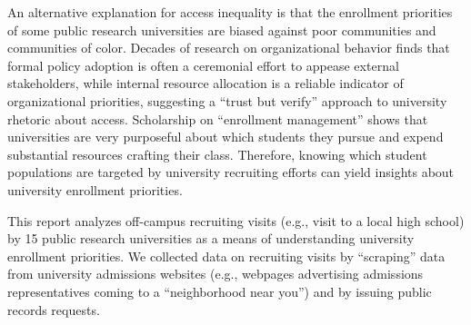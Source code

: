 \documentclass[twoside]{article}
\begin{document}
An alternative explanation for access inequality is that the enrollment priorities of some public research universities are biased against poor communities and communities of color. Decades of research on organizational behavior finds that formal policy adoption is often a ceremonial effort to appease external stakeholders, while internal resource allocation is a reliable indicator of organizational priorities, suggesting a ``trust but verify'' approach to university rhetoric about access. Scholarship on ``enrollment management'' shows that universities are very purposeful about which students they pursue and expend substantial resources crafting their class.  Therefore, knowing which student populations are targeted by university recruiting efforts can yield insights about university enrollment priorities.

This report analyzes off-campus recruiting visits (e.g., visit to a local high school) by 15 public research universities as a means of understanding university enrollment priorities. We collected data on recruiting visits by ``scraping'' data from university admissions websites (e.g., webpages advertising admissions representatives coming to a ``neighborhood near you'') and by issuing public records requests. 
\end{document}
